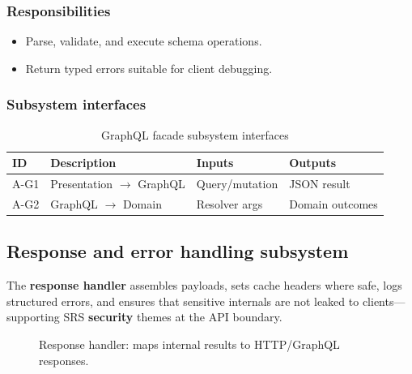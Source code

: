 \subsubsection{Responsibilities}
\begin{itemize}
  \item Parse, validate, and execute schema operations.
  \item Return typed errors suitable for client debugging.
\end{itemize}

\subsubsection{Subsystem interfaces}
\begin{table}[H]
\centering
\small
\begin{tabular}{|p{0.9cm}|p{3.4cm}|p{3.0cm}|p{3.5cm}|}
\hline
\textbf{ID} & \textbf{Description} & \textbf{Inputs} & \textbf{Outputs} \\
\hline
A-G1 & Presentation $\rightarrow$ GraphQL & Query/mutation & JSON result \\
\hline
A-G2 & GraphQL $\rightarrow$ Domain & Resolver args & Domain outcomes \\
\hline
\end{tabular}
\caption{GraphQL facade subsystem interfaces}
\end{table}

\subsection{Response and error handling subsystem}

The \textbf{response handler} assembles payloads, sets cache headers where safe, logs structured errors, and ensures that sensitive internals are not leaked to clients—supporting SRS \textbf{security} themes at the API boundary.

\begin{figure}[H]
\centering
{}
\caption{Response handler: maps internal results to HTTP/GraphQL responses.}
\label{fig:app-resp}
\end{figure}

